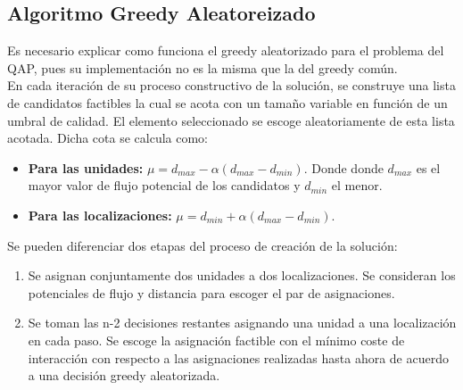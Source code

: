 \documentclass[a4paper, 12pt]{article}
\begin{document}
     	\newpage
     	\subsection{Algoritmo Greedy Aleatoreizado}
     	Es necesario explicar como funciona el greedy aleatorizado para el problema del QAP, pues su implementación no es la misma que la del greedy común.\\
     	
     	En cada iteración de su proceso constructivo de la solución, se construye una lista de candidatos factibles la cual se acota con un tamaño variable en función de un umbral de calidad. El elemento seleccionado se escoge aleatoriamente de esta lista acotada. Dicha cota se calcula como:
     	\begin{itemize}
     		\item \textbf{Para las unidades:} $\mu = d_{max} - \alpha(d_{max}-d_{min})$. Donde donde $d_{max}$ es el mayor valor de flujo potencial de los candidatos y $d_{min}$ el menor.
     		
     		\item \textbf{Para las localizaciones:} $\mu = d_{min} + \alpha(d_{max}-d_{min})$.
     	\end{itemize}
     	
     	 Se pueden diferenciar dos etapas del proceso de creación de la solución:
     	\begin{enumerate}
     		\item Se asignan conjuntamente dos unidades a dos localizaciones. Se consideran los potenciales de flujo y distancia para escoger el par de asignaciones.
     		
     		\item Se toman las n-2 decisiones restantes asignando una unidad a una localización en cada paso. Se escoge la asignación factible con el mínimo coste de interacción con respecto a las asignaciones realizadas hasta ahora de acuerdo a una decisión greedy aleatorizada.
     	\end{enumerate}
     	
\end{document}
